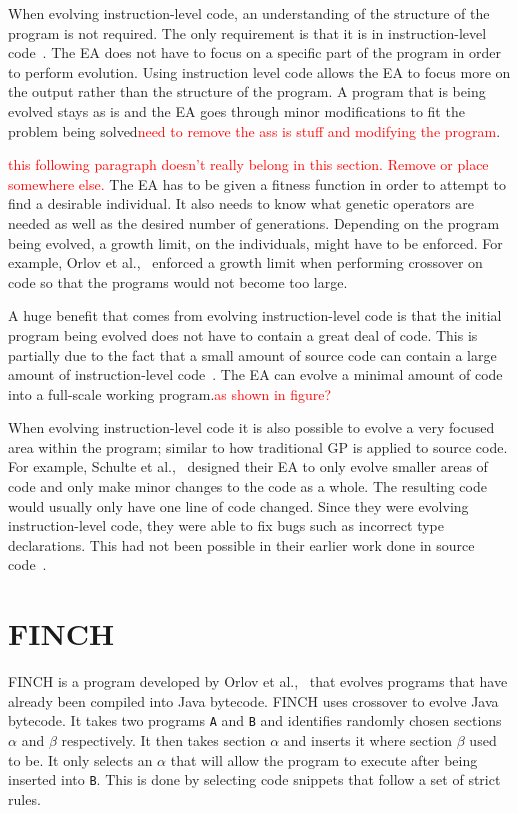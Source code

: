 \documentclass{sig-alternate}
\newcommand{\mycomment}[1]{\textcolor{red}{#1}}
\begin{document}
When evolving instruction-level code, an understanding of the structure of the program is not required. The only requirement is that it is in instruction-level code~\cite{FINCH2:2009, Assembly:2010}. The EA does not have to focus on a specific part of the program in order to perform evolution. Using instruction level code allows the EA to focus more on the output rather than the structure of the program. A program that is being evolved stays as is and the EA goes through minor modifications to fit the problem being solved\mycomment{need to remove the ass is stuff and modifying the program}. 
\par
\mycomment{this following paragraph doesn't really belong in this section. Remove or place somewhere else.}
The EA has to be given a fitness function in order to attempt to find a desirable individual. It also needs to know what genetic operators are needed as well as the desired number of generations. Depending on the program being evolved, a growth limit, on the individuals, might have to be enforced. For example, Orlov et al.,~\cite{FINCH:2011} enforced a growth limit when performing crossover on code so that the programs would not become too large.

A huge benefit that comes from evolving instruction-level code is that the initial program being evolved does not have to contain a great deal of code. This is partially due to the fact that a small amount of source code can contain a large amount of instruction-level code~\cite{Assembly:2010}. The EA can evolve a minimal amount of code into a full-scale working program.\mycomment{as shown in figure?}\par 

When evolving instruction-level code it is also possible to evolve a very focused area within the program; similar to how traditional GP is applied to source code. For example, Schulte et al.,~\cite{Assembly:2010} designed their EA to only evolve smaller areas of code and only make minor changes to the code as a whole. The resulting code would usually only have one line of code changed. Since they were evolving instruction-level code, they were able to fix bugs such as incorrect type declarations. This had not been possible in their earlier work done in source code~\cite{Forrest:2009}. 

\section{FINCH}
FINCH is a program developed by Orlov et al.,~\cite{FINCH2:2009,FINCH:2011} that evolves programs that have already been compiled into Java bytecode. FINCH uses crossover to evolve Java bytecode. It takes two programs \texttt{A} and \texttt{B} and identifies randomly chosen sections $\alpha$ and $\beta$ respectively. It then takes section $\alpha$ and inserts it where section $\beta$ used to be. It only selects an $\alpha$ that will allow the program to execute after being inserted into \texttt{B}. This is done by selecting code snippets that follow a set of strict rules. 
\end{document}
